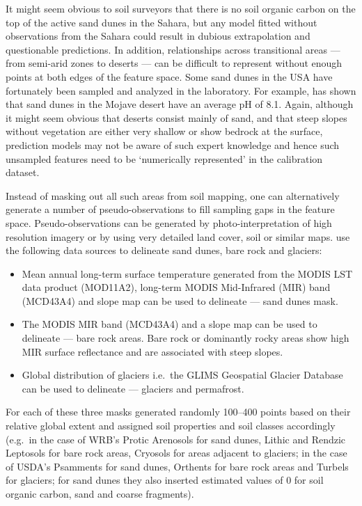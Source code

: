 \documentclass[11pt]{krantz}
\theoremstyle{definition}
\theoremstyle{definition}
\theoremstyle{definition}
\theoremstyle{remark}
\begin{document}
It might seem obvious to soil surveyors that there is no soil organic
carbon on the top of the active sand dunes in the Sahara, but any model
fitted without observations from the Sahara could result in dubious
extrapolation and questionable predictions. In addition, relationships
across transitional areas --- from semi-arid zones to deserts --- can be
difficult to represent without enough points at both edges of the
feature space. Some sand dunes in the USA have fortunately been sampled
and analyzed in the laboratory. For example, \citet{Lei1998} has shown
that sand dunes in the Mojave desert have an average pH of 8.1. Again,
although it might seem obvious that deserts consist mainly of sand, and
that steep slopes without vegetation are either very shallow or show
bedrock at the surface, prediction models may not be aware of such
expert knowledge and hence such unsampled features need to be
`numerically represented' in the calibration dataset.

Instead of masking out all such areas from soil mapping, one can
alternatively generate a number of pseudo-observations to fill sampling
gaps in the feature space. Pseudo-observations can be generated by
photo-interpretation of high resolution imagery or by using very
detailed land cover, soil or similar maps.
\citet{Hengl2017SoilGrids250m} use the following data sources to
delineate sand dunes, bare rock and glaciers:

\begin{itemize}
\item
  Mean annual long-term surface temperature generated from the MODIS LST
  data product (MOD11A2), long-term MODIS Mid-Infrared (MIR) band
  (MCD43A4) and slope map can be used to delineate --- sand dunes mask.
\item
  The MODIS MIR band (MCD43A4) and a slope map can be used to delineate
  --- bare rock areas. Bare rock or dominantly rocky areas show high MIR
  surface reflectance and are associated with steep slopes.
\item
  Global distribution of glaciers i.e.~the GLIMS Geospatial Glacier
  Database \citep{raup2007glims} can be used to delineate --- glaciers
  and permafrost.
\end{itemize}

For each of these three masks \citet{Hengl2017SoilGrids250m} generated
randomly 100--400 points based on their relative global extent and
assigned soil properties and soil classes accordingly (e.g.~in the case
of WRB's Protic Arenosols for sand dunes, Lithic and Rendzic Leptosols
for bare rock areas, Cryosols for areas adjacent to glaciers; in the
case of USDA's Psamments for sand dunes, Orthents for bare rock areas
and Turbels for glaciers; for sand dunes they also inserted estimated
values of 0 for soil organic carbon, sand and coarse fragments).
\end{document}
